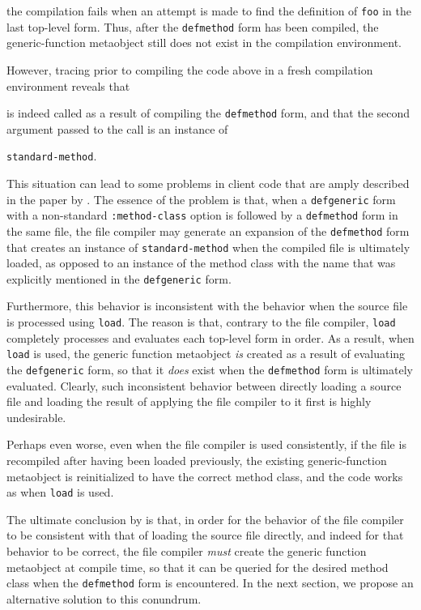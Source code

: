 \noindent
the compilation fails when an attempt is made to find the definition
of \texttt{foo} in the last top-level form.  Thus, after the
\texttt{defmethod} form has been compiled, the generic-function
metaobject still does not exist in the compilation environment.

However, tracing \mml{} prior to compiling the code above in a fresh
compilation environment reveals that 

\mml{} is indeed called as a
result of compiling the \texttt{defmethod} form, and that the second
argument passed to the call is an instance of

\texttt{standard-method}.

This situation can lead to some problems in client code that are amply
described in the paper by \cnh{}.  The essence of the
problem is that, when a \texttt{defgeneric} form with a
non-standard \texttt{:method-class} option is followed by a
\texttt{defmethod} form in the same file, the file compiler may
generate an expansion of the \texttt{defmethod} form that creates an
instance of \texttt{standard-method} when the compiled file is
ultimately loaded, as opposed to an instance of the method class with
the name that was explicitly mentioned in the \texttt{defgeneric}
form.

Furthermore, this behavior is inconsistent with the behavior when the
source file is processed using \texttt{load}.  The reason is that,
contrary to the file compiler, \texttt{load} completely processes and
evaluates each top-level form in order.  As a result, when
\texttt{load} is used, the generic function metaobject \emph{is}
created as a result of evaluating the \texttt{defgeneric} form, so
that it \emph{does} exist when the \texttt{defmethod} form is
ultimately evaluated.  Clearly, such inconsistent behavior between
directly loading a source file and loading the result of applying the
file compiler to it first is highly undesirable.

Perhaps even worse, even when the file compiler is used consistently,
if the file is recompiled after having been loaded previously, the
existing generic-function metaobject is reinitialized to have the
correct method class, and the code works as when \texttt{load} is
used.

The ultimate conclusion by \cnh{} is that, in order for
the behavior of the file compiler to be consistent with that of
loading the source file directly, and indeed for that behavior to be
correct, the file compiler \emph{must} create the generic function
metaobject at compile time, so that it can be queried for the desired
method class when the \texttt{defmethod} form is encountered.  In the
next section, we propose an alternative solution to this conundrum.


